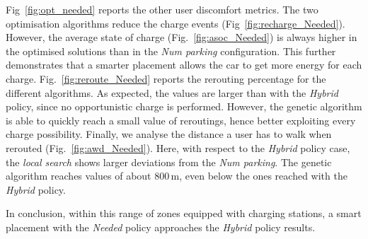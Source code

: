 \documentclass[review, letterpaper,3p, 11pt]{elsarticle}
\newcommand{\dg}[1]{{\color{orange}{[danilo: #1]}}}
\begin{document}
Fig~\ref{fig:opt_needed} reports the other user discomfort metrics.
The two optimisation algorithms reduce the charge events (Fig~\ref{fig:recharge_Needed}).
However,  the average state of charge (Fig.~\ref{fig:asoc_Needed}) is always higher in the optimised solutions than in the \textit{Num parking} configuration. This further demonstrates that a smarter placement allows the car to get more energy for each charge.
Fig.~\ref{fig:reroute_Needed} reports the rerouting percentage for the different algorithms. As expected, the values are larger than with the \textit{Hybrid} policy, since no opportunistic charge is performed. 
However, the genetic algorithm is able to quickly reach a small value of reroutings, hence better exploiting every charge possibility. 
Finally, we analyse the distance a user has to walk when rerouted (Fig.~\ref{fig:awd_Needed}). Here, with respect to the \textit{Hybrid} policy case, the \textit{local search} shows larger deviations from the \textit{Num parking}. The genetic algorithm reaches values of about 800\,m, even below the ones reached with the \textit{Hybrid} policy.

In conclusion, within this range of zones equipped with charging stations, a smart placement with the \textit{Needed} policy approaches the \textit{Hybrid} policy results.  



 
 
 
 
\end{document}
